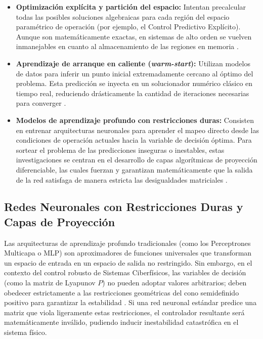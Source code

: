 \begin{itemize}
    \item \textbf{Optimización explícita y partición del espacio:} Intentan precalcular todas las posibles soluciones algebraicas para cada región del espacio paramétrico de operación (por ejemplo, el Control Predictivo Explícito). Aunque son matemáticamente exactas, en sistemas de alto orden se vuelven inmanejables en cuanto al almacenamiento de las regiones en memoria \cite{bemporad2002explicit}.
    \item \textbf{Aprendizaje de arranque en caliente (\textit{warm-start}):} Utilizan modelos de datos para inferir un punto inicial extremadamente cercano al óptimo del problema. Esta predicción se inyecta en un solucionador numérico clásico en tiempo real, reduciendo drásticamente la cantidad de iteraciones necesarias para converger \cite{sambharya2023end}.
    \item \textbf{Modelos de aprendizaje profundo con restricciones duras:} Consisten en entrenar arquitecturas neuronales para aprender el mapeo directo desde las condiciones de operación actuales hacia la variable de decisión óptima. Para sortear el problema de las predicciones inseguras o inestables, estas investigaciones se centran en el desarrollo de capas algorítmicas de proyección diferenciable, las cuales fuerzan y garantizan matemáticamente que la salida de la red satisfaga de manera estricta las desigualdades matriciales \cite{grontas2026pinet, tordesillas2023rayen, min2024hardnet}.
\end{itemize}

\subsection{Redes Neuronales con Restricciones Duras y Capas de Proyección}

Las arquitecturas de aprendizaje profundo tradicionales (como los Perceptrones Multicapa o MLP) son aproximadores de funciones universales que transforman un espacio de entrada en un espacio de salida no restringido. Sin embargo, en el contexto del control robusto de Sistemas Ciberfísicos, las variables de decisión (como la matriz de Lyapunov $P$) no pueden adoptar valores arbitrarios; deben obedecer estrictamente a las restricciones geométricas del cono semidefinido positivo para garantizar la estabilidad \cite{yin2021enforcing}. Si una red neuronal estándar predice una matriz que viola ligeramente estas restricciones, el controlador resultante será matemáticamente inválido, pudiendo inducir inestabilidad catastrófica en el sistema físico.

